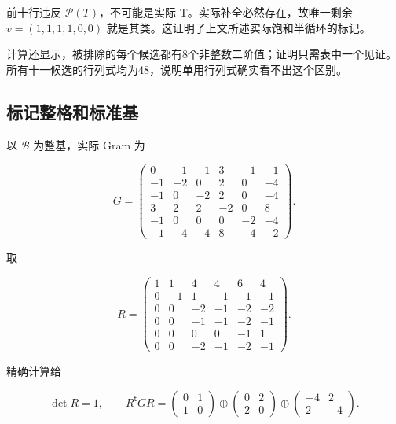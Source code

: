 \documentclass[11pt,a4paper,oneside]{ctexart}
\theoremstyle{cnplain}
\theoremstyle{definition}
\theoremstyle{remark}
\numberwithin{equation}{section}
\begin{document}
前十行违反 \(\mathcal P(T)\)，不可能是实际 T。实际补全必然存在，故唯一剩余 \(v=(1,1,1,1,0,0)\) 就是其类。这证明了上文所述实际饱和半循环的标记。

计算还显示，被排除的每个候选都有8个非整数二阶值；证明只需表中一个见证。所有十一候选的行列式均为48，说明单用行列式确实看不出这个区别。


\subsection{标记整格和标准基}\label{sec:lattice:4}

以 \(\mathcal B\) 为整基，实际 Gram 为

\begin{equation}
G=
\begin{pmatrix}
0&-1&-1&3&-1&-1\\
-1&-2&0&2&0&-4\\
-1&0&-2&2&0&-4\\
3&2&2&-2&0&8\\
-1&0&0&0&-2&-4\\
-1&-4&-4&8&-4&-2
\end{pmatrix}.                                                   \label{eq:lattice:6}
\end{equation}

取

\begin{equation}
R=\begin{pmatrix}
1&1&4&4&6&4\\
0&-1&1&-1&-1&-1\\
0&0&-2&-1&-2&-2\\
0&0&-1&-1&-2&-1\\
0&0&0&0&-1&1\\
0&0&-2&-1&-2&-1
\end{pmatrix}.
\end{equation}

精确计算给

\begin{equation}
\det R=1,\qquad
 R^{\mathsf t}GR=
 \begin{pmatrix}0&1\\1&0\end{pmatrix}
 \oplus\begin{pmatrix}0&2\\2&0\end{pmatrix}
 \oplus\begin{pmatrix}-4&2\\2&-4\end{pmatrix}.                       \label{eq:lattice:7}
\end{equation}
\end{document}
